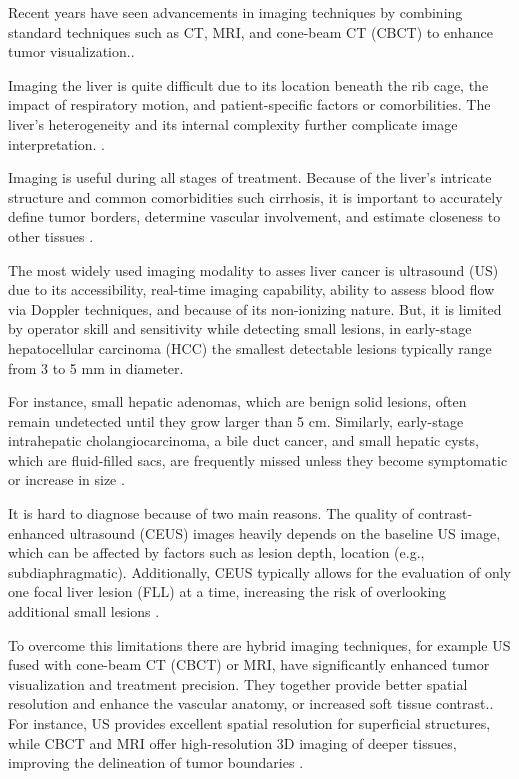 
Recent years have seen advancements in imaging techniques by combining standard techniques such as CT, MRI, and cone-beam CT (CBCT) to enhance tumor visualization.\cite{floridi2022}.

Imaging the liver is quite difficult due to its location beneath the rib cage, the impact of respiratory motion, and patient-specific factors or comorbilities. The liver’s heterogeneity and its internal complexity further complicate image interpretation. \cite{ferraioli2018}.

Imaging is useful during all stages of treatment. Because of the liver's intricate structure and common comorbidities such cirrhosis, it is important to accurately define tumor borders, determine vascular involvement, and estimate closeness to other tissues \cite{floridi2022}.

The most widely used imaging modality to asses liver cancer is ultrasound (US) due to its accessibility, real-time imaging capability, ability to assess blood flow via Doppler techniques, and because of its non-ionizing nature. But, it is limited by operator skill and sensitivity while detecting small lesions, in early-stage hepatocellular carcinoma (HCC) the smallest detectable lesions typically range from 3 to 5 mm in diameter. \cite{mcmahon2023}%

For instance, small hepatic adenomas, which are benign solid lesions, often remain undetected until they grow larger than 5 cm. Similarly, early-stage intrahepatic cholangiocarcinoma, a bile duct cancer, and small hepatic cysts, which are fluid-filled sacs, are frequently missed unless they become symptomatic or increase in size \cite{tre777}. 

It is hard to diagnose because of two main reasons. The quality of contrast-enhanced ultrasound (CEUS) images heavily depends on the baseline US image, which can be affected by factors such as lesion depth, location (e.g., subdiaphragmatic). Additionally, CEUS typically allows for the evaluation of only one focal liver lesion (FLL) at a time, increasing the risk of overlooking additional small lesions \cite{pmc5588445}.

To overcome this limitations there are hybrid imaging techniques, for example US fused with cone-beam CT (CBCT) or MRI, have significantly enhanced tumor visualization and treatment precision. They together provide better spatial resolution and enhance the vascular anatomy, or increased soft tissue contrast.\cite{floridi2022}.  For instance, US provides excellent spatial resolution for superficial structures, while CBCT and MRI offer high-resolution 3D imaging of deeper tissues, improving the delineation of tumor boundaries \cite{pmc3016679}.

